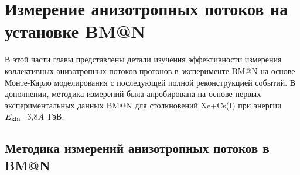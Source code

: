 \section{Измерение анизотропных потоков на установке BM@N \label{bmnanal} }
В этой  части главы представлены детали изучения эффективности измерения коллективных анизотропных потоков протонов в эксперименте BM@N на основе Монте-Карло моделирова­ния с последующей полной реконструкцией событий. 
В дополнении, методика измерений была апробирована на основе первых экспериментальных данных
BM@N для столкновений Xe+Cs(I) при энергии $E_{\rm kin}$=3,8$A$~ГэВ.

\subsection{Методика измерений анизотропных потоков в BM@N}
 
